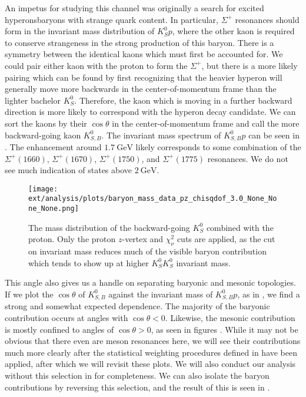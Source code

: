 An impetus for studying this channel was originally a search for excited hyperons\textemdash baryons with strange quark content. In particular, $\Sigma^+$ resonances should form in the invariant mass distribution of $K_S^0 p$, where the other kaon is required to conserve strangeness in the strong production of this baryon. There is a symmetry between the identical kaons which must first be accounted for. We could pair either kaon with the proton to form the $\Sigma^+$, but there is a more likely pairing which can be found by first recognizing that the heavier hyperon will generally move more backwards in the center-of-momentum frame than the lighter bachelor $K_S^0$. Therefore, the kaon which is moving in a further backward direction is more likely to correspond with the hyperon decay candidate. We can sort the kaons by their $\cos\theta$ in the center-of-momentum frame and call the more backward-going kaon $K_{S,B}^0$. The invariant mass spectrum of $K_{S,B}^0 p$ can be seen in . The enhancement around $\SI{1.7}{\giga\electronvolt}$ likely corresponds to some combination of the $\Sigma^+(1660)$, $\Sigma^+(1670)$, $\Sigma^+(1750)$, and $\Sigma^+(1775)$ resonances. We do not see much indication of states above $\SI{2}{\giga\electronvolt}$.

\begin{figure}
  \begin{center}
    \texttt{[image: ext/analysis/plots/baryon\_mass\_data\_pz\_chisqdof\_3.0\_None\_None\_None.png]}
  \end{center}
  \caption{The mass distribution of the backward-going $K_S^0$ combined with the proton. Only the proton $z$-vertex and $\chi^2_\nu$ cuts are applied, as the cut on invariant mass reduces much of the visible baryon contribution which tends to show up at higher $K_S^0K_S^0$ invariant mass.}\label{fig:baryon-mass-data-pz-chisqdof-3.0}
\end{figure}


This angle also gives us a handle on separating baryonic and mesonic topologies. If we plot the $\cos\theta$ of $K_{S,B}^0$ against the invariant mass of $K_{S,B}^0 p$, as in , we find a strong and somewhat expected dependence. The majority of the baryonic contribution occurs at angles with $\cos\theta < 0$. Likewise, the mesonic contribution is mostly confined to angles of $\cos\theta > 0$, as seen in figures . While it may not be obvious that there even are meson resonances here, we will see their contributions much more clearly after the statistical weighting procedures defined in  have been applied, after which we will revisit these plots. We will also conduct our analysis without this selection in  for completeness. We can also isolate the baryon contributions by reversing this selection, and the result of this is seen in .

